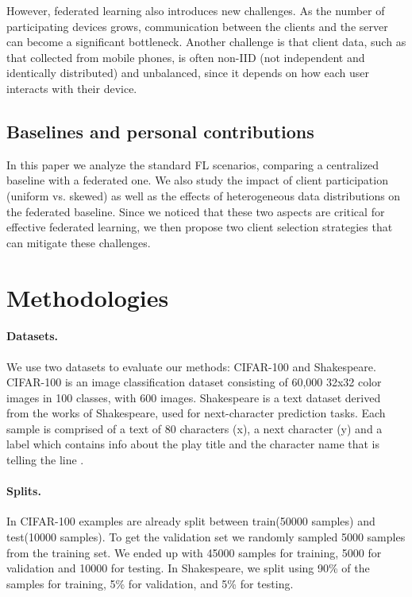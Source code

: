 \documentclass[10pt,twocolumn,letterpaper]{article}
\begin{document}
However, federated learning also introduces new challenges. As the number of participating devices grows, communication between the clients and the server can become a significant bottleneck. Another challenge is that client data, such as that collected from mobile phones, is often non-IID (not independent and identically distributed) and unbalanced, since it depends on how each user interacts with their device.

\subsection{Baselines and personal contributions}

In this paper we analyze the standard FL scenarios, comparing a centralized baseline with a federated one. 
We also study the impact of client participation (uniform vs. skewed) as well as the effects of heterogeneous data distributions on the federated baseline.
Since we noticed that these two aspects are critical for effective federated learning, we then propose two client selection strategies that can mitigate these challenges.


\section{Methodologies}
\label{sec:formatting} 
\paragraph{Datasets.}
We use two datasets to evaluate our methods: CIFAR-100 and Shakespeare.
CIFAR-100 \cite{Cifar} is an image classification dataset consisting of 60,000 32x32 color images in 100 classes, with 600 images.
Shakespeare \cite{Shakespeare} is a text dataset derived from the works of Shakespeare, used for next-character prediction tasks. Each sample is comprised of a text of 80 characters (x), a next character (y) and a label which contains info about the play title and the character name that is telling the line .
\paragraph{Splits.}
In CIFAR-100 examples are already split between train(50000 samples) and test(10000 samples). To get the validation set we randomly sampled 5000 samples from the training set.
 We ended up with 45000 samples for training, 5000 for validation and 10000 for testing.
In Shakespeare, we split using 90\% of the samples for training, 5\% for validation, and 5\% for testing.  
\end{document}
